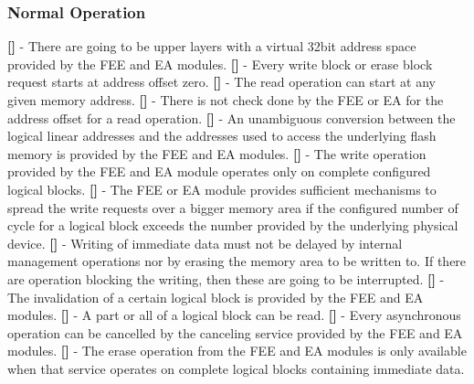\subsubsection{Normal Operation}
{\bf []} - There are going to be upper layers with a virtual 32bit address space provided by the FEE and EA modules.\newline
\newline
{\bf []} - Every write block or erase block request starts at address offset zero.\newline
\newline
{\bf []} - The read operation can start at any given memory address.\newline
\newline
{\bf []} - There is not check done by the FEE or EA for the address offset for a read operation.\newline
\newline
{\bf []} - An unambiguous conversion between the logical linear addresses and the addresses used to access the underlying flash memory is provided by the FEE and EA modules.\newline
\newline
{\bf []} - The write operation provided by the FEE and EA module operates only on complete configured logical blocks.\newline
\newline
{\bf []} - The FEE or EA module provides sufficient mechanisms to spread the write requests over a bigger memory area if the configured number of cycle for a logical block exceeds the number provided by the underlying physical device.\newline
\newline
{\bf []} - Writing of immediate data must not be delayed by internal management operations nor by erasing the memory area to be written to. If there are operation blocking the writing, then these are going to be interrupted.\newline
\newline
{\bf []} - The invalidation of a certain logical block is provided by the FEE and EA modules.\newline
\newline
{\bf []} - A part or all of a logical block can be read.\newline
\newline
{\bf []} - Every asynchronous operation can be cancelled by the canceling service provided by the FEE and EA modules.\newline
\newline
{\bf []} - The erase operation from the FEE and EA modules is only available when that service operates on complete logical blocks containing immediate data.
